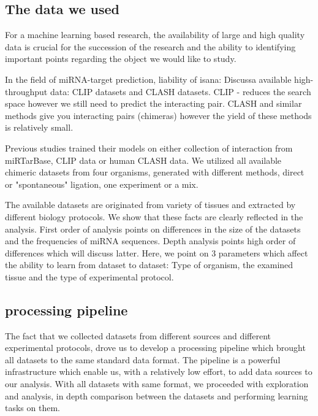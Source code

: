 \documentclass{bmcart}
\begin{document}
\subsection*{The data we used}
For a machine learning based research, the availability of large and high quality data is crucial for the succession of the research and the ability to identifying important points regarding the object we would like to study.

In the field of miRNA-target prediction, liability of isana: Discussa available high-throughput data: CLIP datasets and CLASH datasets. CLIP - reduces the search space however we still need to predict the interacting pair. CLASH and similar methods give you interacting pairs (chimeras) however the yield of these methods is relatively small. 

Previous studies trained their models on either collection of interaction from miRTarBase, CLIP data or human CLASH data. We utilized all available chimeric datasets from four organisms, generated with different methods, direct or "spontaneous" ligation, one experiment or a mix.

The available datasets are originated from variety of tissues and extracted by different biology protocols. We show that these facts are clearly reflected in the analysis. First order of analysis points on differences in the size of the datasets and the frequencies of miRNA sequences. Depth analysis points high order of differences which will discuss latter. Here, we point on 3 parameters which affect the ability to learn from dataset to dataset: Type of organism, the examined tissue and the type of experimental protocol.

\subsection*{processing pipeline}
The fact that we collected datasets from different sources and different experimental protocols, drove us to develop a processing pipeline which brought all datasets to the same standard data format. The pipeline is a powerful infrastructure which enable us, with a relatively low effort, to add data sources to our analysis. With all datasets with same format, we proceeded with exploration and analysis, in depth comparison between the datasets and performing learning tasks on them.
\end{document}
